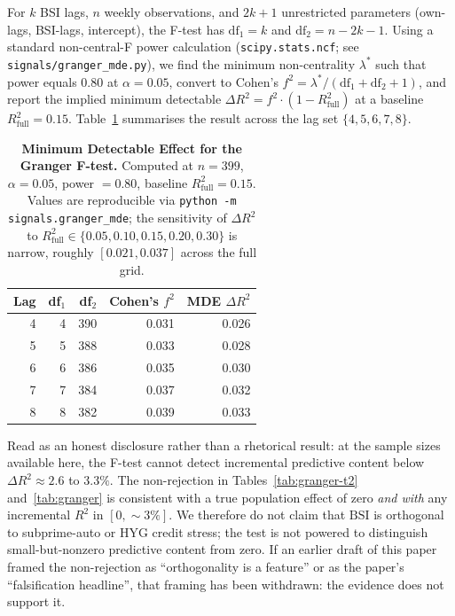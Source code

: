 \documentclass[11pt,letterpaper]{article}
\newcommand{\bsi}{\text{BSI}}
\begin{document}
For $k$ BSI lags, $n$ weekly observations, and $2k + 1$ unrestricted
parameters (own-lags, BSI-lags, intercept), the F-test has
$\text{df}_1 = k$ and $\text{df}_2 = n - 2k - 1$. Using a standard
non-central-F power calculation
(\texttt{scipy.stats.ncf}; see \texttt{signals/granger\_mde.py}), we
find the minimum non-centrality $\lambda^*$ such that power equals
$0.80$ at $\alpha = 0.05$, convert to Cohen's
$f^2 = \lambda^* / (\text{df}_1 + \text{df}_2 + 1)$, and report the
implied minimum detectable $\Delta R^2 = f^2 \cdot (1 - R^2_\text{full})$
at a baseline $R^2_\text{full} = 0.15$. Table~\ref{tab:mde} summarises
the result across the lag set $\{4, 5, 6, 7, 8\}$.

\begin{table}[H]
\centering
\small
\begin{tabular}{rrrrr}
\toprule
\textbf{Lag} & \textbf{df$_1$} & \textbf{df$_2$} & \textbf{Cohen's } $f^2$ & \textbf{MDE } $\Delta R^2$ \\
\midrule
4 & 4 & 390 & 0.031 & 0.026 \\
5 & 5 & 388 & 0.033 & 0.028 \\
6 & 6 & 386 & 0.035 & 0.030 \\
7 & 7 & 384 & 0.037 & 0.032 \\
8 & 8 & 382 & 0.039 & 0.033 \\
\bottomrule
\end{tabular}
\caption{\textbf{Minimum Detectable Effect for the Granger F-test.}
Computed at $n = 399$, $\alpha = 0.05$, power $= 0.80$, baseline
$R^2_\text{full} = 0.15$. Values are reproducible via
\texttt{python -m signals.granger\_mde}; the sensitivity of
$\Delta R^2$ to $R^2_\text{full} \in \{0.05, 0.10, 0.15, 0.20, 0.30\}$
is narrow, roughly $[0.021, 0.037]$ across the full grid.}
\label{tab:mde}
\end{table}

Read as an honest disclosure rather than a rhetorical result: at the
sample sizes available here, the F-test cannot detect incremental
predictive content below $\Delta R^2 \approx 2.6$ to $3.3\%$. The
non-rejection in Tables~\ref{tab:granger-t2} and~\ref{tab:granger} is
consistent with a true population effect of zero \emph{and with} any
incremental $R^2$ in $[0, \sim\!3\%]$. We therefore do not claim that
$\bsi$ is orthogonal to subprime-auto or HYG credit stress; the test
is not powered to distinguish small-but-nonzero predictive content from
zero. If an earlier draft of this paper framed the non-rejection as
``orthogonality is a feature'' or as the paper's ``falsification
headline'', that framing has been withdrawn: the evidence does not
support it.
\end{document}

